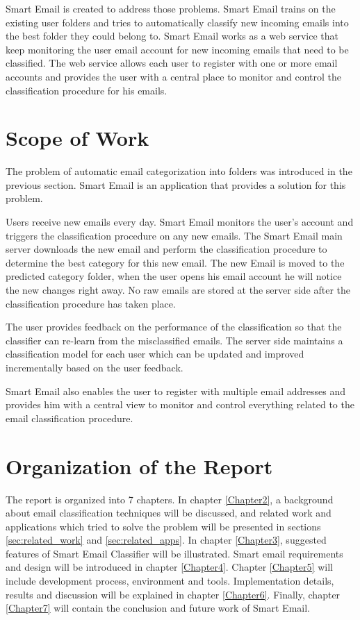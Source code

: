 Smart Email is created to address those problems. Smart Email trains on the 
existing user folders and tries to automatically classify new incoming emails 
into the best folder they could belong to. Smart Email works as a web service 
that keep monitoring the user email account for new incoming emails that need 
to be classified. The web service allows each user to register with one or more 
email accounts and provides the user with a central place to monitor and control 
the classification procedure for his emails.

\section{Scope of Work}

The problem of automatic email categorization into folders was introduced
in the previous section. Smart Email is an application that provides a solution
for this problem.

Users receive new emails every day. Smart Email monitors the user's 
account and triggers the classification procedure on any new emails. 
The Smart Email main server downloads the new email and perform the 
classification procedure to determine the best category for this new 
email. The new Email is moved to the predicted category folder, when the user 
opens his email account he will notice the new changes right away. No raw emails 
are stored at the server side after the classification procedure has taken place.

The user provides feedback on the performance of the classification so that the 
classifier can re-learn from the misclassified emails. The server side maintains 
a classification model for each user which can be updated and improved incrementally 
based on the user feedback.

Smart Email also enables the user to register with multiple email addresses and 
provides him with a central view to monitor and control everything related to 
the email classification procedure.


\section{Organization of the Report}

The report is organized into 7 chapters. In chapter \ref{Chapter2}, a background 
about email classification techniques will be discussed, and related work and applications
which tried to solve the problem will be presented in sections \ref{sec:related_work} 
and \ref{sec:related_apps}. In chapter \ref{Chapter3}, suggested features of Smart 
Email Classifier will be illustrated.
Smart email requirements and design will be introduced in chapter \ref{Chapter4}.
Chapter \ref{Chapter5} will include development process, environment and tools. 
Implementation details, results and discussion will be explained in chapter \ref{Chapter6}. Finally,  
chapter \ref{Chapter7} will contain the conclusion and future work of Smart Email.


